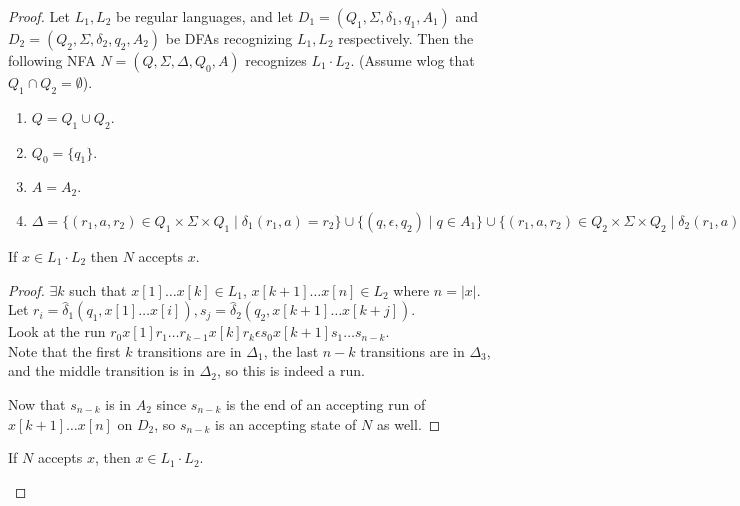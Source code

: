 \documentclass[a4paper]{article}
\begin{document}
\begin{proof}
    Let $L_1, L_2$ be regular languages, and let $D_1 = (Q_1, \Sigma, \delta_1, q_1, A_1)$ and $D_2 = (Q_2, \Sigma, \delta_2, q_2, A_2)$ be DFAs recognizing $L_1, L_2$ respectively. Then the
    following NFA $N = (Q, \Sigma, \Delta, Q_0, A)$ recognizes $L_1 \cdot L_2$. (Assume wlog that $Q_1 \cap Q_2 = \emptyset$).

    \begin{enumerate}
        \item $Q = Q_1 \cup Q_2$.
        \item $Q_0 = \{q_1\}$.
        \item $A = A_2$.
        \item $\Delta = \{(r_1, a, r_2) \in Q_1 \times \Sigma \times Q_1 \mid \delta_1(r_1, a) = r_2\} \cup \{(q, \epsilon, q_2) \mid q \in A_1\} \cup \{(r_1, a, r_2) \in Q_2 \times \Sigma
            \times Q_2 \mid \delta_2(r_1, a) = r_2\} = \Delta_1 \cup \Delta_2 \cup \Delta_3$
    \end{enumerate}

    \begin{claim}
        If $x \in L_1 \cdot L_2$ then $N$ accepts $x$.
    \end{claim}


    \begin{proof}
        $\exists k$ such that $x[1]\ldots x[k] \in L_1$, $x[k+1]\ldots x[n]\in L_2$ where $n = |x|$.\\

        Let $r_i = \hat{\delta}_1(q_1, x[1] \ldots x[i]), s_j = \hat{\delta}_2(q_2, x[k + 1] \ldots x[k + j])$.\\

        Look at the run
        $r_0 x[1] r_1 \ldots r_{k-1} x[k] r_k \epsilon s_0 x[k + 1] s_1 \ldots s_{n-k}$.\\

        Note that the first $k$ transitions are in $\Delta_1$, the last $n - k$ transitions are in $\Delta_3$, and the middle transition is in $\Delta_2$, so this is indeed a run.

        Now that $s_{n-k}$ is in $A_2$ since $s_{n-k}$ is the end of an accepting run of $x[k+1]\ldots x[n]$ on $D_2$, so $s_{n-k}$ is an accepting state of $N$ as well.

    \end{proof}


    \begin{claim}
        If $N$ accepts $x$, then $x \in L_1 \cdot L_2$.
    \end{claim}



\end{proof}
\end{document}
